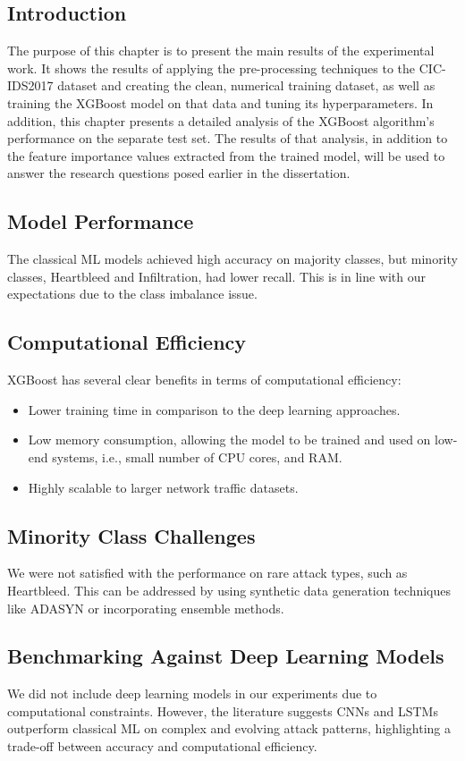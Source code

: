 \subsection{Introduction}

The purpose of this chapter is to present the main results of the experimental work. It shows the results of applying the pre-processing techniques to the CIC-IDS2017 dataset and creating the clean, numerical training dataset, as well as training the XGBoost model on that data and tuning its hyperparameters. In addition, this chapter presents a detailed analysis of the XGBoost algorithm’s performance on the separate test set. The results of that analysis, in addition to the feature importance values extracted from the trained model, will be used to answer the research questions posed earlier in the dissertation.

\subsection{Model Performance} 
The classical ML models achieved high accuracy on majority classes, but minority classes, Heartbleed and Infiltration, had lower recall. This is in line with our expectations due to the class imbalance issue.

\subsection{Computational Efficiency} 
XGBoost has several clear benefits in terms of computational efficiency:
\begin{itemize} 
	\item Lower training time in comparison to the deep learning approaches.
	\item Low memory consumption, allowing the model to be trained and used on low-end systems, i.e., small number of CPU cores, and RAM.
	\item Highly scalable to larger network traffic datasets.
\end{itemize} 

\subsection{Minority Class Challenges} 
We were not satisfied with the performance on rare attack types, such as Heartbleed. This can be addressed by using synthetic data generation techniques like ADASYN or incorporating ensemble methods.

\subsection{Benchmarking Against Deep Learning Models} 
We did not include deep learning models in our experiments due to computational constraints. However, the literature suggests CNNs and LSTMs outperform classical ML on complex and evolving attack patterns, highlighting a trade-off between accuracy and computational efficiency.

